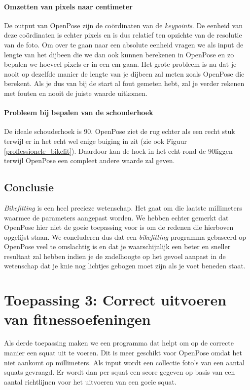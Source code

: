 \documentclass[a4paper,twoside,kulak]{kulakreport}
\begin{document}
\paragraph{Omzetten van pixels naar centimeter}
De output van OpenPose zijn de coördinaten van de \textit{keypoints}. De eenheid van deze coördinaten is echter pixels en is dus relatief ten opzichte van de resolutie van de foto. Om over te gaan naar een absolute eenheid vragen we als input de lengte van het dijbeen die we dan ook kunnen berekenen in OpenPose en zo bepalen we hoeveel pixels er in een \si{cm} gaan. Het grote probleem is nu dat je nooit op dezelfde manier de lengte van je dijbeen zal meten zoals OpenPose die berekent. Als je dus van bij de start al fout gemeten hebt, zal je verder rekenen met fouten en nooit de juiste waarde uitkomen.

\paragraph{Probleem bij bepalen van de schouderhoek}
De ideale schouderhoek is 90\degree. OpenPose ziet de rug echter als een recht stuk terwijl er in het echt wel enige buiging in zit (zie ook Figuur \ref{proffessionele_bikefit}). Daardoor kan de hoek in het echt rond de 90\degree liggen terwijl OpenPose een compleet andere waarde zal geven.

\subsection{Conclusie}
\textit{Bikefitting} is een heel precieze wetenschap. Het gaat om die laatste millimeters waarmee de parameters aangepast worden. We hebben echter gemerkt dat OpenPose hier niet de goeie toepassing voor is om de redenen die hierboven opgelijst staan. We concluderen dus dat een \textit{bikefitting} programma gebaseerd op OpenPose veel te omslachtig is en dat je waarschijnlijk een beter en sneller resultaat zal hebben indien je de zadelhoogte op het gevoel aanpast in de wetenschap dat je knie nog lichtjes gebogen moet zijn als je voet beneden staat.


\section{Toepassing 3: Correct uitvoeren van fitnessoefeningen}

Als derde toepassing maken we een programma dat helpt om op de correcte manier een squat uit te voeren. Dit is meer geschikt voor OpenPose omdat het niet aankomt op millimeters. Als input wordt een collectie foto's van een aantal squats gevraagd. Er wordt dan per squat een score gegeven op basis van een aantal richtlijnen voor het uitvoeren van een goeie squat.\cite{squats} 
\end{document}
